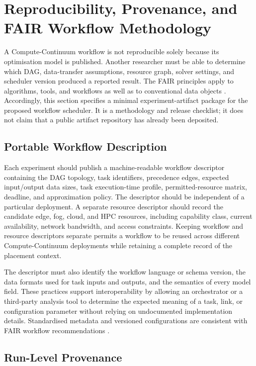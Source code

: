 \section{Reproducibility, Provenance, and FAIR Workflow Methodology}
\label{sec:reproducibility}

A Compute-Continuum workflow is not reproducible solely because its optimisation model is published. Another researcher must be able to determine which DAG, data-transfer assumptions, resource graph, solver settings, and scheduler version produced a reported result. The FAIR principles apply to algorithms, tools, and workflows as well as to conventional data objects \cite{wilkinson2016fair}. Accordingly, this section specifies a minimal experiment-artifact package for the proposed workflow scheduler. It is a methodology and release checklist; it does not claim that a public artifact repository has already been deposited.

\subsection{Portable Workflow Description}

Each experiment should publish a machine-readable workflow descriptor containing the DAG topology, task identifiers, precedence edges, expected input/output data sizes, task execution-time profile, permitted-resource matrix, deadline, and approximation policy. The descriptor should be independent of a particular deployment. A separate resource descriptor should record the candidate edge, fog, cloud, and HPC resources, including capability class, current availability, network bandwidth, and access constraints. Keeping workflow and resource descriptors separate permits a workflow to be reused across different Compute-Continuum deployments while retaining a complete record of the placement context.

The descriptor must also identify the workflow language or schema version, the data formats used for task inputs and outputs, and the semantics of every model field. These practices support interoperability by allowing an orchestrator or a third-party analysis tool to determine the expected meaning of a task, link, or configuration parameter without relying on undocumented implementation details. Standardised metadata and versioned configurations are consistent with FAIR workflow recommendations \cite{devisser2023fairworkflows}.

\subsection{Run-Level Provenance}

